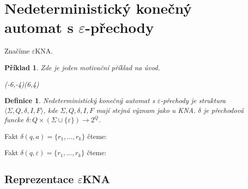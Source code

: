 \documentclass[10pt, a4paper, titlepage]{article}
\theoremstyle{note}
\newtheorem{definice}{Definice}
\newtheorem{priklad}{Příklad}
\newcommand{\ekna}{$\varepsilon$KNA}		%
\begin{document}
\section{Nedeterministický konečný automat s $\varepsilon$-přechody}
Značíme \ekna.
\begin{priklad}\label{priklad-5}
Zde je jeden motivační příklad na úvod.

\begin{center}
\begin{VCPicture}{(-6,-4)(6,4)}
\end{VCPicture}
\end{center}

\end{priklad}

\begin{definice}
Nedeterministický konečný automat s $\varepsilon$-přechody je struktura $ \langle \Sigma,Q,\delta,I,F \rangle $, kde $\Sigma,Q,\delta,I,F$ mají stejná význam jako u KNA. $\delta$ je přechodová funcke $\delta : Q \times (\Sigma \cup \lbrace \varepsilon \rbrace ) \rightarrow 2^Q$.
\end{definice}

Fakt $\delta (q,a) = \lbrace r_1,\ldots,r_k \rbrace $ čteme: 

Fakt $\delta (q,\varepsilon) = \lbrace r_1,\ldots,r_k \rbrace $ čteme: 

\subsection{Reprezentace \ekna}
\end{document}
